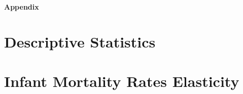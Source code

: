 
\LARGE{\textbf{Appendix}}





\section{Descriptive Statistics}\label{app:stats}






\section{Infant Mortality Rates Elasticity}\label{app:elasticity}

